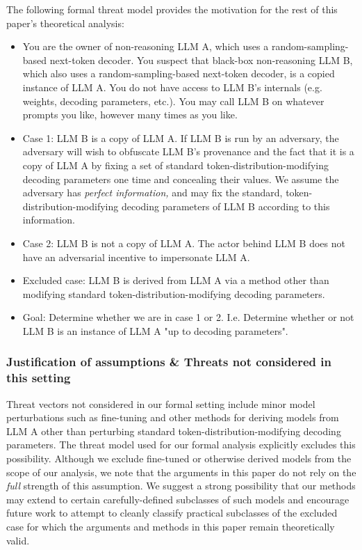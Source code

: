 \documentclass{article}
\begin{document}
The following formal threat model provides the motivation for the rest of this paper's theoretical analysis:
\begin{itemize}
\item You are the owner of non-reasoning LLM A, which uses a random-sampling-based next-token decoder. You suspect that black-box non-reasoning LLM B, which also uses a random-sampling-based next-token decoder, is a copied instance of LLM A. You do not have access to LLM B's internals (e.g. weights, decoding parameters, etc.). You may call LLM B on whatever prompts you like, however many times as you like.
\item Case 1: LLM B is a copy of LLM A. If LLM B is run by an adversary, the adversary will wish to obfuscate LLM B's provenance and the fact that it is a copy of LLM A by fixing a set of standard token-distribution-modifying decoding parameters one time and concealing their values. We assume the adversary has \textit{perfect information,} and may fix the standard, token-distribution-modifying decoding parameters of LLM B according to this information.
\item Case 2: LLM B is not a copy of LLM A. The actor behind LLM B does not have an adversarial incentive to impersonate LLM A.
\item Excluded case: LLM B is derived from LLM A via a method other than modifying standard token-distribution-modifying decoding parameters.
\item Goal: Determine whether we are in case 1 or 2. I.e. Determine whether or not LLM B is an instance of LLM A "up to decoding parameters".
\end{itemize}



\subsubsection{Justification of assumptions \& Threats not considered in this setting}

Threat vectors not considered in our formal setting include minor model perturbations such as fine-tuning and other methods for deriving models from LLM A other than perturbing standard token-distribution-modifying decoding parameters. The threat model used for our formal analysis explicitly excludes this possibility. Although we exclude fine-tuned or otherwise derived models from the scope of our analysis, we note that the arguments in this paper do not rely on the \textit{full} strength of this assumption. We suggest a strong possibility that our methods may extend to certain carefully-defined subclasses of such models and encourage future work to attempt to cleanly classify practical subclasses of the excluded case for which the arguments and methods in this paper remain theoretically valid.
\end{document}
